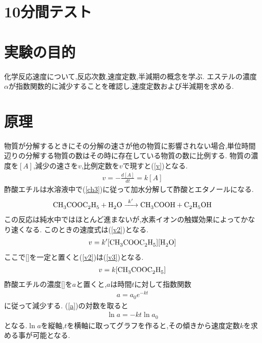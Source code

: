 \documentclass[a4j,10pt,dvipdfmx]{jarticle}
\begin{document}
\section{10分間テスト}
\section{実験の目的}
化学反応速度について,反応次数,速度定数,半減期の概念を学ぶ.
エステルの濃度$\alpha$が指数関数的に減少することを確認し,速度定数および半減期を求める.
\section{原理}
物質が分解するときにその分解の速さが他の物質に影響されない場合,単位時間辺りの分解する物質の数はその時に存在している物質の数に比例する.
物質の濃度を$[A]$,減少の速さを$v$,比例定数を$v$で現すと(\ref{v})となる.
\begin{eqnarray}
  \label{v}
  v = - \frac{d[A]}{dt} = k[A]
\end{eqnarray}
酢酸エチルは水溶液中で(\ref{ch3})に従って加水分解して酢酸とエタノールになる.
\begin{eqnarray}
  \label{ch3}
\ce{ CH3COOC2H5 + H2O ->C[{k'} ] CH3COOH + C2H5OH }
\end{eqnarray}
この反応は純水中ではほとんど進まないが,水素イオンの触媒効果によってかなり速くなる.
このときの速度式は(\ref{v2})となる.
\begin{eqnarray}
  \label{v2}
  v = k'[\ce{CH3COOC2H5}][\ce{H2O}]
\end{eqnarray}
ここで[]を一定と置くと(\ref{v2})は(\ref{v3})となる.
\begin{eqnarray}
  \label{v3}
  v = k[\ce{CH3COOC2H5}]
\end{eqnarray}
酢酸エチルの濃度[]を$a$と置くと,$a$は時間$t$に対して指数関数
\begin{eqnarray}
  \label{a}
  a = a_0e^{-kt}
\end{eqnarray}
に従って減少する.
(\ref{a})の対数を取ると
\begin{eqnarray}
  \label{aln}
  \ln a = -kt \ln a_0
\end{eqnarray}
となる.$\ln a$を縦軸,$t$を横軸に取ってグラフを作ると,その傾きから速度定数$k$を求める事が可能となる.
\end{document}
